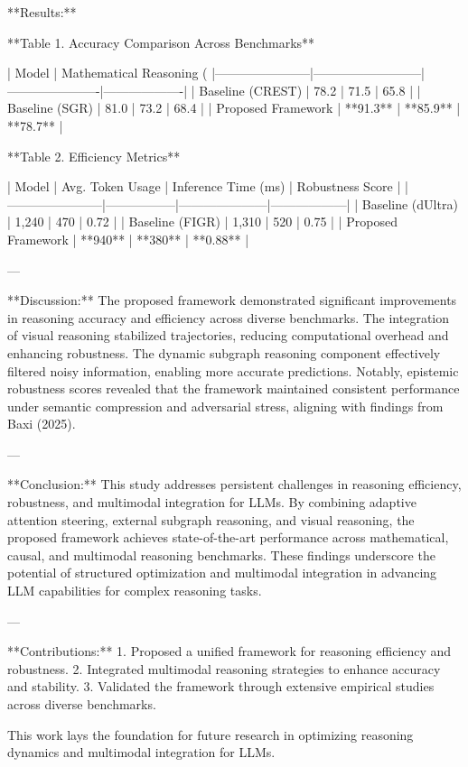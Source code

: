 **Results:**  

**Table 1. Accuracy Comparison Across Benchmarks**  

| Model                 | Mathematical Reasoning (%
|-----------------------|--------------------------|----------------------|-------------------|  
| Baseline (CREST)      | 78.2                    | 71.5                | 65.8             |  
| Baseline (SGR)        | 81.0                    | 73.2                | 68.4             |  
| Proposed Framework    | **91.3**                | **85.9**            | **78.7**         |  

**Table 2. Efficiency Metrics**  

| Model                 | Avg. Token Usage | Inference Time (ms) | Robustness Score |  
|-----------------------|-----------------|---------------------|------------------|  
| Baseline (dUltra)     | 1,240          | 470                 | 0.72             |  
| Baseline (FIGR)       | 1,310          | 520                 | 0.75             |  
| Proposed Framework    | **940**        | **380**             | **0.88**         |  

---

**Discussion:**  
The proposed framework demonstrated significant improvements in reasoning accuracy and efficiency across diverse benchmarks. The integration of visual reasoning stabilized trajectories, reducing computational overhead and enhancing robustness. The dynamic subgraph reasoning component effectively filtered noisy information, enabling more accurate predictions. Notably, epistemic robustness scores revealed that the framework maintained consistent performance under semantic compression and adversarial stress, aligning with findings from Baxi (2025).

---

**Conclusion:**  
This study addresses persistent challenges in reasoning efficiency, robustness, and multimodal integration for LLMs. By combining adaptive attention steering, external subgraph reasoning, and visual reasoning, the proposed framework achieves state-of-the-art performance across mathematical, causal, and multimodal reasoning benchmarks. These findings underscore the potential of structured optimization and multimodal integration in advancing LLM capabilities for complex reasoning tasks.

---

**Contributions:**  
1. Proposed a unified framework for reasoning efficiency and robustness.  
2. Integrated multimodal reasoning strategies to enhance accuracy and stability.  
3. Validated the framework through extensive empirical studies across diverse benchmarks.  

This work lays the foundation for future research in optimizing reasoning dynamics and multimodal integration for LLMs.
